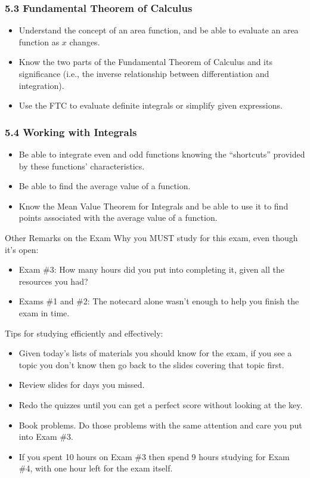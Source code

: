 \documentclass[14pt]{beamer}
\begin{document}
\begin{frame}
\frametitle{5.3  Fundamental Theorem of Calculus}
\begin{itemize}
\item Understand the concept of an area function, and be able to evaluate an area function as $x$ changes.
\item Know the two parts of the Fundamental Theorem of Calculus and its significance (i.e., the inverse relationship between differentiation and integration).
\item Use the FTC to evaluate definite integrals or simplify given expressions.
\end{itemize}
\end{frame}

\begin{frame}
\frametitle{5.4  Working with Integrals}
\begin{itemize}
\item Be able to integrate even and odd functions knowing the ``shortcuts'' provided by these functions' characteristics.
\item Be able to find the average value of a function.
\item Know the Mean Value Theorem for Integrals and be able to use it to find points associated with the average value of a function.
\end{itemize}
\end{frame}

\begin{frame}{Other Remarks on the Exam}
Why you MUST study for this exam, even though it's open:
\begin{itemize}
\item Exam \#3: How many hours did you put into completing it, given all the resources you had?  
\item Exams \#1 and \#2: The notecard alone wasn't enough to help you finish the exam in time.
\end{itemize}
\end{frame}

\begin{frame}
\footnotesize
Tips for studying efficiently and effectively:
\begin{itemize}
\item Given today's lists of materials you should know for the exam, if you see a topic you don't know then go back to the slides covering that topic first.
\item Review slides for days you missed.
\item Redo the quizzes until you can get a perfect score without looking at the key.
\item Book problems.  Do those problems with the same attention and care you put into Exam \#3.  
\item If you spent 10 hours on Exam \#3 then spend 9 hours studying for Exam \#4, with one hour left for the exam itself.
\end{itemize}	
\end{frame}

\begin{comment}
\end{comment}
\end{document}

